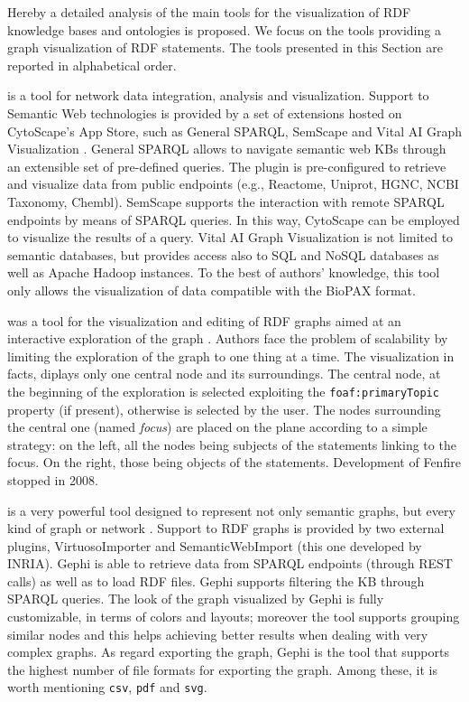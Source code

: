 Hereby a detailed analysis of the main tools for the visualization of RDF knowledge bases and ontologies is proposed. We focus on the tools providing a graph visualization of RDF statements. The tools presented in this Section are reported in alphabetical order.
\begin{description}[wide, labelindent=0pt]
\item[CytoScape] is a tool for network data integration, analysis and visualization. Support to Semantic Web technologies is provided by a set of extensions hosted on CytoScape's App Store, such as General SPARQL,  SemScape and Vital AI Graph Visualization \cite{shannon2003cytoscape}.
General SPARQL allows to navigate semantic web KBs through an extensible set of pre-defined queries. The plugin is pre-configured to retrieve and visualize data from public endpoints (e.g., Reactome, Uniprot, HGNC, NCBI Taxonomy, Chembl). SemScape supports the interaction with remote SPARQL endpoints by means of SPARQL queries. In this way, CytoScape can be employed to visualize the results of a query. Vital AI Graph Visualization is not limited to semantic databases, but provides access also to SQL and NoSQL databases as well as Apache Hadoop instances. To the best of authors' knowledge, this tool only allows the visualization of data compatible with the BioPAX format.
\item[Fenfire] was a tool for the visualization and editing of RDF graphs aimed at an interactive exploration of the graph \cite{hastrup2008browsing}. Authors face the problem of scalability by
limiting the exploration of the graph to one thing at a time. The visualization in facts, diplays only one central node and its surroundings. The central node, at the beginning of the exploration is selected exploiting the \texttt{foaf:primaryTopic} property (if present), otherwise is selected by the user. The nodes surrounding the central one (named \textit{focus}) are placed on the plane according to a simple strategy: on the left, all the nodes being subjects of the statements linking to the focus. On the right, those being objects of the statements. Development of Fenfire stopped in 2008.
\item[Gephi] is a very powerful tool designed to represent not only semantic graphs, but every kind of graph or network \cite{bastian2009gephi}. Support to RDF graphs is provided by two external plugins, VirtuosoImporter and SemanticWebImport (this one developed by INRIA). Gephi is able to retrieve data from SPARQL endpoints (through REST calls) as well as to load RDF files. Gephi supports filtering the KB through SPARQL queries. The look of the graph visualized by Gephi is fully customizable, in terms of colors and layouts; moreover the tool supports grouping similar nodes and this helps achieving better results when dealing with very complex graphs. As regard exporting the graph, Gephi is the tool that supports the highest number of file formats for exporting the graph. Among these, it is worth mentioning \texttt{csv}, \texttt{pdf} and \texttt{svg}.

\end{description}
